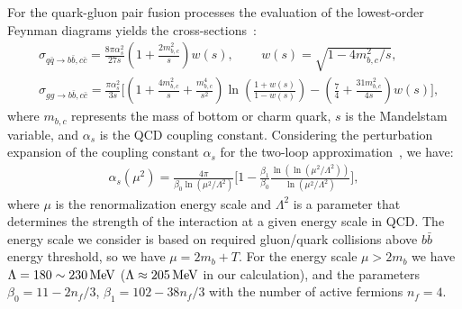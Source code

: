 For the quark-gluon pair fusion processes
the evaluation of the lowest-order Feynman diagrams yields the cross-sections~\cite{Letessier:2002ony}:
\begin{align}
&\sigma_{q\bar{q}\rightarrow b\bar{b},c\bar{c}}=\frac{8\pi\alpha_s^2}{27s}\left(1+\frac{2m_{b,c}^2}{s}\right)w(s),\,\qquad w(s)=\sqrt{1-{4m^2_{b,c}}/{s}},\\
&\sigma_{gg\rightarrow b\bar{b},c\bar{c}}=\!\frac{\pi\alpha_s^2}{3s}\bigg[\left(1\!+\!\frac{4m^2_{b,c}}{s}\!+\!\frac{m^4_{b,c}}{s^2}\right)\ln{\left(\frac{1+w(s)}{1-w(s)}\right)}\!-\!\left(\frac{7}{4}\!+\!\frac{31m^2_{b,c}}{4s}\right)w(s)\bigg],
\end{align} 
where $m_{b,c}$ represents the mass of bottom or charm quark, $s$ is the Mandelstam variable, and $\alpha_s$ is the QCD coupling constant. Considering the perturbation expansion of the coupling constant $\alpha_s$ for the two-loop approximation~\cite{Letessier:2002ony}, we have:
\begin{align}
\alpha_s(\mu^2)=\frac{4\pi}{\beta_0\ln({\mu^2/\Lambda^2})}\bigg[1-\frac{\beta_1}{\beta_0}\frac{\ln(\ln{(\mu^2/\Lambda^2)})}{\ln(\mu^2/\Lambda^2)}\bigg],
\end{align}
where $\mu$ is the renormalization energy scale and $\Lambda^2$ is a parameter that determines the strength of the interaction at a given energy scale in QCD. The energy scale we consider is based on required gluon/quark collisions above $b\bar b$ energy threshold, so we have $\mu=2m_b+T$. For the energy scale $\mu>2m_b$ we have $\Lambda=180\sim230\text{\,MeV}$ ($\Lambda\approx205\text{\,MeV}$ in our calculation), and the parameters $\beta_0=11-2n_f/3$, $\beta_1=102-38n_f/3$ with the number of active fermions $n_f=4$. 

